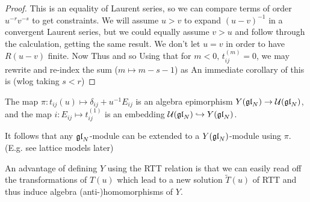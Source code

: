 \documentclass{article}
\begin{document}
\begin{proof}
{}
This is an equality of Laurent series, so we can compare terms of order $u^{-r}v^{-s}$ to get constraints. We will assume $u > v$ to expand $(u-v)^{-1}$ in a convergent Laurent series, but we could equally assume $v > u$ and follow through the calculation, getting the same result. We don't let $u=v$ in order to have $R(u-v)$ finite. Now 
Thus 
and so 
Using that for $m <0, \, t_{ij}^{(m)} = 0$, we may rewrite and re-index the sum ($m \mapsto m-s-1$) as 
An immediate corollary of this is (wlog taking $s <r$)
\end{proof}

\begin{prop}
The map $\pi: t_{ij}(u) \mapsto \delta_{ij} + u^{-1}E_{ij}$ is an algebra epimorphism $Y(\mathfrak{gl}_N) \to \mathcal{U}(\mathfrak{gl}_N)$, and the map $i : E_{ij} \mapsto t_{ij}^{(1)}$ is an embedding $\mathcal{U}(\mathfrak{gl}_N) \hookrightarrow Y(\mathfrak{gl}_N)$. 
\end{prop}

\begin{remark}
It follows that any $\mathfrak{gl}_N$-module can be extended to a $Y(\mathfrak{gl}_N)$-module using $\pi$. (E.g. see lattice models later)
\end{remark}

An advantage of defining $Y$ using the RTT relation is that we can easily read off the transformations of $T(u)$ which lead to a new solution $\tilde{T}(u)$ of RTT and thus induce algebra (anti-)homomorphisms of $Y$. 
\end{document}
